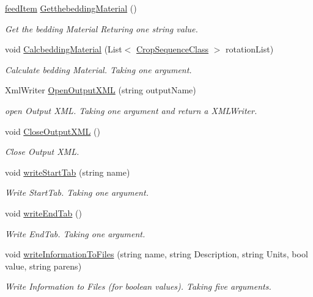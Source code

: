 \begin{DoxyCompactItemize}
\mbox{\hyperlink{classfeed_item}{feed\+Item}} \mbox{\hyperlink{class_global_vars_a94dc7347c7b4fc213dc302d321b33b9e}{Getthebedding\+Material}} ()
\begin{DoxyCompactList}\small\item\em Get the bedding Material Returing one string value. \end{DoxyCompactList}\item 
void \mbox{\hyperlink{class_global_vars_a0646815f7f1f52f4b870f0cde29b0109}{Calcbedding\+Material}} (List$<$ \mbox{\hyperlink{class_crop_sequence_class}{Crop\+Sequence\+Class}} $>$ rotation\+List)
\begin{DoxyCompactList}\small\item\em Calculate bedding Material. Taking one argument. \end{DoxyCompactList}\item 
Xml\+Writer \mbox{\hyperlink{class_global_vars_a7391bb9604228a9d2a281cb33f77961e}{Open\+Output\+X\+ML}} (string output\+Name)
\begin{DoxyCompactList}\small\item\em open Output X\+ML. Taking one argument and return a X\+M\+L\+Writer. \end{DoxyCompactList}\item 
void \mbox{\hyperlink{class_global_vars_a7c7a6c35950707c1982a5a5148294c8d}{Close\+Output\+X\+ML}} ()
\begin{DoxyCompactList}\small\item\em Close Output X\+ML. \end{DoxyCompactList}\item 
void \mbox{\hyperlink{class_global_vars_a92285c751d72b917a757414a0ec47c34}{write\+Start\+Tab}} (string name)
\begin{DoxyCompactList}\small\item\em Write Start\+Tab. Taking one argument. \end{DoxyCompactList}\item 
void \mbox{\hyperlink{class_global_vars_a0622b1088cb0857945702489c0edc4e5}{write\+End\+Tab}} ()
\begin{DoxyCompactList}\small\item\em Write End\+Tab. Taking one argument. \end{DoxyCompactList}\item 
void \mbox{\hyperlink{class_global_vars_afabbc57efc23ce430454ada8a6439f81}{write\+Information\+To\+Files}} (string name, string Description, string Units, bool value, string parens)
\begin{DoxyCompactList}\small\item\em Write Information to Files (for boolean values). Taking five arguments. \end{DoxyCompactList}\item 

\end{DoxyCompactItemize}
